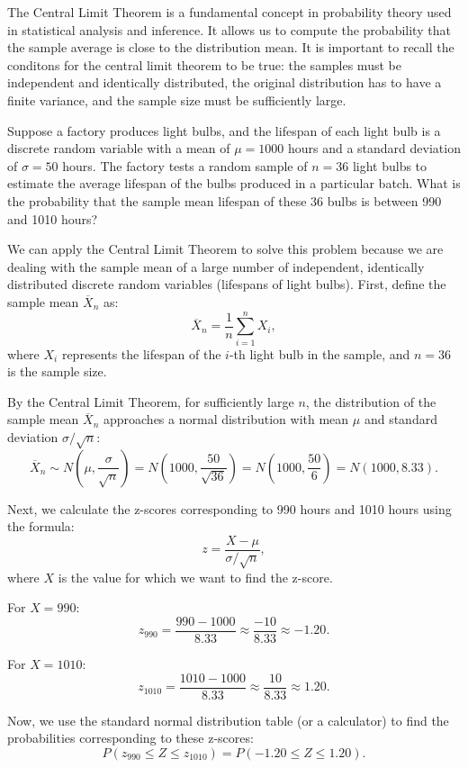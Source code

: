 The Central Limit Theorem is a fundamental concept in probability theory used in statistical analysis and inference. It allows us to compute the probability that the sample average is close to the distribution mean. It is important to recall the conditons for the central limit theorem to be true: the samples must be independent and identically distributed, the original distribution has to have a finite variance, and the sample size must be sufficiently large.

\begin{example}
Suppose a factory produces light bulbs, and the lifespan of each light bulb is a discrete random variable with a mean of $\mu = 1000$ hours and a standard deviation of $\sigma = 50$ hours. The factory tests a random sample of $n = 36$ light bulbs to estimate the average lifespan of the bulbs produced in a particular batch. What is the probability that the sample mean lifespan of these 36 bulbs is between 990 and 1010 hours?

We can apply the Central Limit Theorem to solve this problem because we are dealing with the sample mean of a large number of independent, identically distributed discrete random variables (lifespans of light bulbs). First, define the sample mean $\overline{X}_n$ as:
\[
\overline{X}_n = \frac{1}{n} \sum_{i=1}^{n} X_i,
\]
where $X_i$ represents the lifespan of the $i$-th light bulb in the sample, and $n = 36$ is the sample size.

By the Central Limit Theorem, for sufficiently large $n$, the distribution of the sample mean $\overline{X}_n$ approaches a normal distribution with mean $\mu$ and standard deviation $\sigma/\sqrt{n}$:
\[
\overline{X}_n \sim N\left(\mu, \frac{\sigma}{\sqrt{n}}\right) = N\left(1000, \frac{50}{\sqrt{36}}\right) = N\left(1000, \frac{50}{6}\right) = N\left(1000, 8.33\right).
\]

Next, we calculate the z-scores corresponding to 990 hours and 1010 hours using the formula:
\[
z = \frac{X - \mu}{\sigma/\sqrt{n}},
\]
where $X$ is the value for which we want to find the z-score.

For $X = 990$:
\[
z_{990} = \frac{990 - 1000}{8.33} \approx \frac{-10}{8.33} \approx -1.20.
\]

For $X = 1010$:
\[
z_{1010} = \frac{1010 - 1000}{8.33} \approx \frac{10}{8.33} \approx 1.20.
\]

Now, we use the standard normal distribution table (or a calculator) to find the probabilities corresponding to these z-scores:
\[
P(z_{990} \leq Z \leq z_{1010}) = P(-1.20 \leq Z \leq 1.20).
\]


\end{example}
